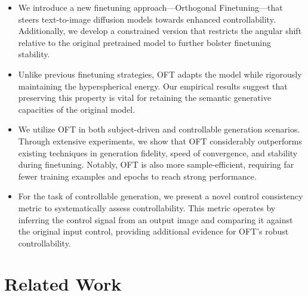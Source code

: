 \begin{itemize}[leftmargin=*,nosep]

    \item We introduce a new finetuning approach—Orthogonal Finetuning—that steers text-to-image diffusion models towards enhanced controllability. Additionally, we develop a constrained version that restricts the angular shift relative to the original pretrained model to further bolster finetuning stability.
    \item Unlike previous finetuning strategies, OFT adapts the model while rigorously maintaining the hyperspherical energy. Our empirical results suggest that preserving this property is vital for retaining the semantic generative capacities of the original model.
    \item We utilize OFT in both subject-driven and controllable generation scenarios. Through extensive experiments, we show that OFT considerably outperforms existing techniques in generation fidelity, speed of convergence, and stability during finetuning. Notably, OFT is also more sample-efficient, requiring far fewer training examples and epochs to reach strong performance.
    \item For the task of controllable generation, we present a novel control consistency metric to systematically assess controllability. This metric operates by inferring the control signal from an output image and comparing it against the original input control, providing additional evidence for OFT’s robust controllability.
\end{itemize}

\section{Related Work}

